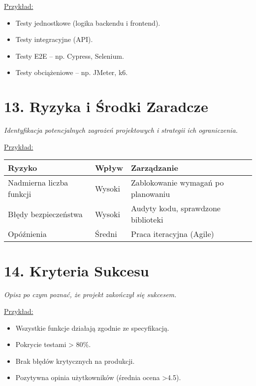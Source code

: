 \documentclass[a4paper,12pt]{article}
\begin{document}
\vspace{0.5 cm}
 \noindent
\underline{Przykład:} 
\begin{itemize}
    \item Testy jednostkowe (logika backendu i frontend).
    \item Testy integracyjne (API).
    \item Testy E2E – np. Cypress, Selenium.
    \item Testy obciążeniowe – np. JMeter, k6.
\end{itemize}

\section*{13. Ryzyka i Środki Zaradcze}
\textit{Identyfikacja potencjalnych zagrożeń projektowych i strategii ich ograniczenia.}

\vspace{0.5 cm}
 \noindent
\underline{Przykład:} 
\begin{longtable}{|p{5cm}|p{3cm}|p{6cm}|}
\hline
\textbf{Ryzyko} & \textbf{Wpływ} & \textbf{Zarządzanie} \\
\hline
Nadmierna liczba funkcji & Wysoki & Zablokowanie wymagań po planowaniu \\
\hline
Błędy bezpieczeństwa & Wysoki & Audyty kodu, sprawdzone biblioteki \\
\hline
Opóźnienia & Średni & Praca iteracyjna (Agile) \\
\hline
\end{longtable}

\section*{14. Kryteria Sukcesu}
\textit{Opisz po czym poznać, że projekt zakończył się sukcesem.}

\vspace{0.5 cm}
 \noindent
\underline{Przykład:} 
\vspace{0.5 cm}
 \noindent
\begin{itemize}
    \item Wszystkie funkcje działają zgodnie ze specyfikacją.
    \item Pokrycie testami > 80\%.
    \item Brak błędów krytycznych na produkcji.
    \item Pozytywna opinia użytkowników (średnia ocena \textgreater 4.5).
\end{itemize}
\end{document}
